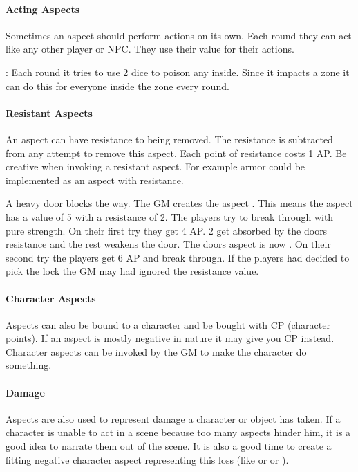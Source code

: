\documentclass[11pt]{article}
\begin{document}
{\paragraph*{Acting Aspects}
\label{sec:org812bc01}

Sometimes an aspect should perform actions on its own. Each round they can act like any other player or NPC. They use their value for their actions.

\begin{pwexample}
: Each round it tries to use 2 dice to poison any inside. Since it impacts a zone it can do this for everyone inside the zone every round.
\end{pwexample}
\paragraph*{Resistant Aspects}
\label{sec:org674d41e}
An aspect can have resistance to being removed. The resistance is subtracted from any attempt to remove this aspect. Each point of resistance costs 1 AP. Be creative when invoking a resistant aspect. For example armor could be implemented as an aspect with resistance.

\begin{pwexample}
A heavy door blocks the way. The GM creates the aspect . This means the aspect has a value of 5 with a resistance of 2. The players try to break through with pure strength. On their first try they get 4 AP. 2 get absorbed by the doors resistance and the rest weakens the door. The doors aspect is now . On their second try the players get 6 AP and break through.
If the players had decided to pick the lock the GM may had ignored the resistance value.
\end{pwexample}
\paragraph*{Character Aspects}
\label{sec:orgfb4b311}

Aspects can also be bound to a character and be bought with CP (character points). If an aspect is mostly negative in nature it may give you CP instead. Character aspects can be invoked by the GM to make the character do something. 
\paragraph*{Damage}
\label{sec:orgb098020}

Aspects are also used to represent damage a character or object has taken. If a character is unable to act in a scene because too many aspects hinder him, it is a good idea to narrate them out of the scene. It is also a good time to create a fitting negative character aspect representing this loss (like  or  or ).
}
\end{document}
